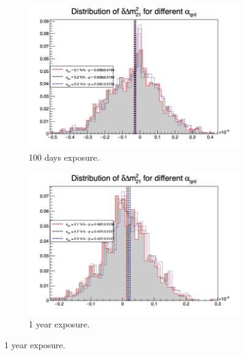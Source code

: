 \documentclass[../main.tex]{subfiles}
\begin{document}
\begin{figure}[th]
  \centering
  \begin{subfigure}[t]{0.48\linewidth}
    \includegraphics[width=\linewidth]{images/joint_fit/stat_tests/chi2_delta_m_100d.png}
    \caption{100 days exposure.}
  \end{subfigure}
  \begin{subfigure}[t]{0.48\linewidth}
    \includegraphics[width=\linewidth]{images/joint_fit/stat_tests/chi2_delta_m_1y.png}
    \caption{1 year exposure.}
  \end{subfigure}



\end{figure}
\end{document}
